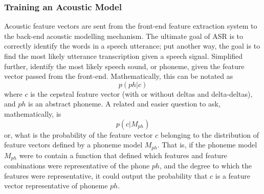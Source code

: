 \subsubsection{Training an Acoustic Model}

Acoustic feature vectors are sent from the front-end feature extraction system to the back-end acoustic modelling mechanism.  The ultimate goal of ASR is to correctly identify the words in a speech utterance; put another way, the goal is to find the most likely utterance transcription given a speech signal.  Simplified further, identify the most likely speech sound, or phoneme, given the feature vector passed from the front-end.  Mathematically, this can be notated as \begin{equation} p(ph|c) \end{equation} where $c$ is the cepstral feature vector (with or without deltas and delta-deltas), and $ph$ is an abstract phoneme.  A related and easier question to ask, mathematically, is \begin{equation} p(c|M_{ph}) \end{equation} or, what is the probability of the feature vector $c$ belonging to the distribution of feature vectors defined by a phoneme model $M_{ph}$.  That is, if the phoneme model $M_{ph}$ were to contain a function that defined which features and feature combinations were representative of the phone $ph$, and the degree to which the features were representative, it could output the probability that $c$ is a feature vector representative of phoneme $ph$.

